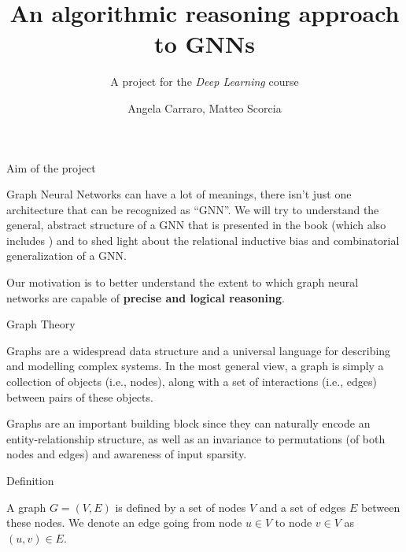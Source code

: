\documentclass[10pt, aspectratio=169, compress, protectframetitle, handout]{beamer}
\title{\vspace*{1.5cm}An algorithmic reasoning approach to GNNs}
\subtitle{A project for the \emph{Deep Learning} course}
\author{Angela Carraro, Matteo Scorcia}
\date{}
\institute{\scshape DSSC + IN20 - UniTS
\vfill
\texttt{[image: logo\_dssc\_alt]}
\hspace*{0.5cm}
\texttt{[image: Logo\_units\_blu]}
}
\newcommand{\putbg}{\usebackgroundtemplate{\texttt{[image: background-vector\_169]}}}
\begin{document}
{\putbg\maketitle}


\begin{frame}{Aim of the project}

    \alert{Graph Neural Networks} can have a lot of meanings, there isn't just one architecture that can be recognized as “GNN”. We will try to understand the general, abstract structure of a GNN that is presented in the book \cite{BookHamiltonGRL} (which also includes \cite{battaglia2018relational}) and to shed light about the relational inductive bias and combinatorial generalization of a GNN.
    
    Our motivation is to better understand the extent to which graph neural networks are capable of \textbf{precise and logical reasoning}.
    
\end{frame}

\begin{frame}{Graph Theory}
    
    Graphs are a widespread data structure and a universal language for describing and modelling complex systems. In the most general view, a graph is simply a collection of objects (i.e., nodes), along with a set of interactions (i.e., edges) between pairs of these objects. 

    Graphs are an important building block since they can naturally encode an entity-relationship structure, as well as an invariance to permutations (of both nodes and edges) and awareness of input sparsity.
    
\end{frame}

\begin{frame}{Definition}
    
    A \alert{graph} $G = (V, E)$ is defined by a set of nodes $V$ and a set of edges $E$ between these nodes. We denote an edge going from node $u \in V$ to node $v \in V$ as $(u, v) \in E$.
\end{frame}
\end{document}
